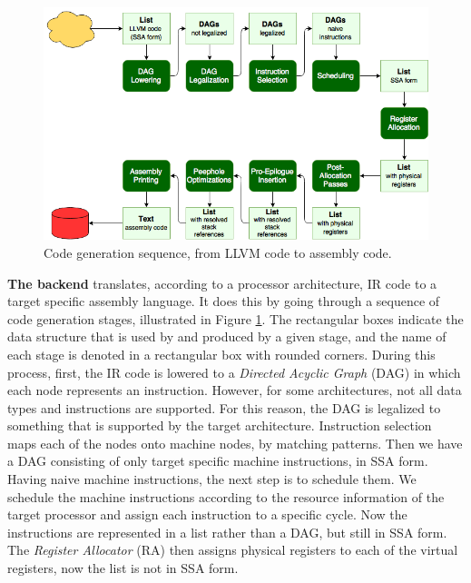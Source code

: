 \begin{figure}[b!]
\centering
\includegraphics[width=\textwidth]{figures/code_generation_sequence}%
\caption{Code generation sequence, from LLVM code to assembly code.}
\label{fig:code_generation}
\end{figure}

\textbf{The backend} translates, according to a processor architecture, IR code to a target specific assembly language. It does this by going through a sequence of code generation stages, illustrated in Figure \ref{fig:code_generation}. The rectangular boxes indicate the data structure that is used by and produced by a given stage, and the name of each stage is denoted in a rectangular box with rounded corners. During this process, first, the IR code is lowered to a \emph{Directed Acyclic Graph} (DAG) in which each node represents an instruction. However, for some architectures, not all data types and instructions are supported. For this reason, the DAG is legalized to something that is supported by the target architecture. Instruction selection maps each of the nodes onto machine nodes, by matching patterns. %
Then we have a DAG consisting of only target specific machine instructions, in SSA form. Having naive machine instructions, the next step is to schedule them. We schedule the machine instructions according to the resource information of the target processor and assign each instruction to a specific cycle. 
Now the instructions are represented in a list rather than a DAG, but still in SSA form. The \emph{Register Allocator} (RA) then assigns physical registers to each of the virtual registers, now the list is not in SSA form. 

